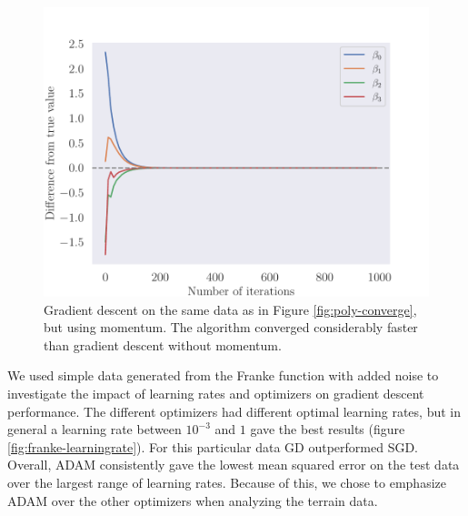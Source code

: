 \begin{figure}
    \centering
    \includegraphics[width=0.99\linewidth]{examples/tests_even/figs/gradient-descent-momentum-polynomial-convergence.pdf}
    \caption{Gradient descent on the same data as in Figure \ref{fig:poly-converge}, but using momentum. The algorithm converged considerably faster than gradient descent without momentum.}
    \label{fig:poly-converge-momentum}
\end{figure}

We used simple data generated from the Franke function \cite{franke1979} with added noise to investigate the impact of learning rates and optimizers on gradient descent performance. The different optimizers had different optimal learning rates, but in general a learning rate between $10^{-3}$ and $1$ gave the best results (figure \ref{fig:franke-learningrate}). For this particular data GD outperformed SGD. Overall, ADAM consistently gave the lowest mean squared error on the test data over the largest range of learning rates. Because of this, we chose to emphasize ADAM over the other optimizers when analyzing the terrain data.

